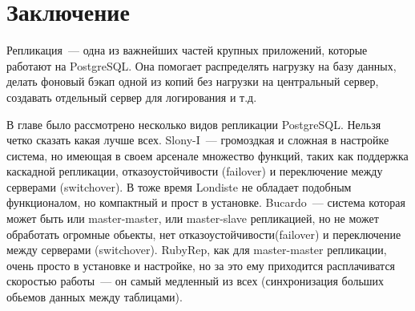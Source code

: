 \section{Заключение}
Репликация~--- одна из важнейших частей крупных приложений, которые работают на PostgreSQL. Она помогает 
распределять нагрузку на базу данных, делать фоновый бэкап одной из копий без нагрузки на центральный сервер, 
создавать отдельный сервер для логирования и т.д.

В главе было рассмотрено несколько видов репликации PostgreSQL. Нельзя четко сказать какая лучше всех. 
Slony-I~--- громоздкая и сложная в настройке система, 
но имеющая в своем арсенале множество функций, таких как поддержка каскадной репликации, отказоустойчивости (failover) 
и переключение между серверами (switchover). В тоже время Londiste не обладает подобным функционалом, 
но компактный и прост в установке. Bucardo~--- система которая может быть или master-master, или 
master-slave репликацией, но не может обработать огромные обьекты, нет отказоустойчивости(failover) 
и переключение между серверами (switchover). RubyRep, как для master-master репликации, 
очень просто в установке и настройке, но за это ему приходится расплачиватся скоростью работы~--- он самый 
медленный из всех (синхронизация больших обьемов данных между таблицами).